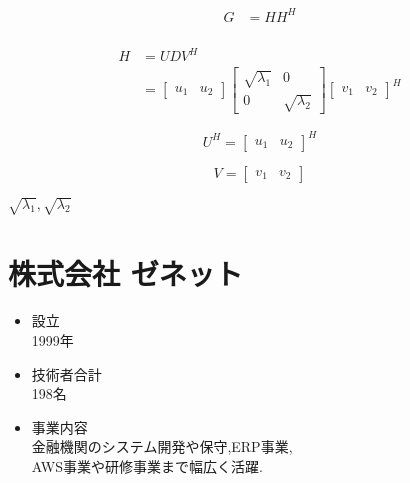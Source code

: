 \documentclass{ltjsarticle}
\begin{document}
\begin{align*}
  G &= HH^H\\
\end{align*}

\begin{align*}
  H &= UDV^H\\
    &=
    \begin{bmatrix}
      u_1 & u_2
    \end{bmatrix}
    \begin{bmatrix}
      \sqrt{\lambda_1} & 0\\
      0 & \sqrt{\lambda_2}
    \end{bmatrix}
    \begin{bmatrix}
      v_1 & v_2
    \end{bmatrix}^H
\end{align*}

\begin{equation*}
  U^H =
  \begin{bmatrix}
    u_1 & u_2
  \end{bmatrix}^H
\end{equation*}

\begin{equation*}
  V =
  \begin{bmatrix}
    v_1 & v_2
  \end{bmatrix}
\end{equation*}

$\sqrt{\lambda_1},\sqrt{\lambda_2}$

\section*{株式会社 ゼネット}
\begin{itemize}
  \item 設立\\1999年
  \item 技術者合計\\198名
  \item 事業内容\\金融機関のシステム開発や保守,ERP事業,\\AWS事業や研修事業まで幅広く活躍.
\end{itemize}
\end{document}
